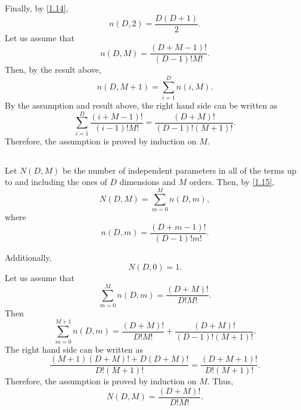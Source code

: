 Finally, by \ref{1.14},
%
\begin{equation}
n(D, 2)
=
\frac{D (D + 1)}{2}.
\end{equation}
%
Let us assume that
%
\begin{equation}
n(D, M)
=
\frac{(D + M - 1)!}{(D - 1)! M!}.
\end{equation}
%
Then, by the result above,
%
\begin{equation}
n(D, M + 1)
=
\sum_{i = 1}^{D}
n(i, M).
\end{equation}
%
By the assumption and result above, the right hand side can be written as
%
\begin{equation}
\sum_{i = 1}^{D}
\frac{(i + M - 1)!}{(i - 1)! M!}
=
\frac{(D + M)!}{(D - 1)! (M + 1)!}.
\end{equation}
%
Therefore, the assumption is proved by induction on $M$.


\subsection{}
\label{1.16}
Let $N(D, M)$ be the number of independent parameters in all of the terms up to and including the ones of $D$ dimensions and $M$ orders.
Then, by \ref{1.15},
%
\begin{equation}
N(D, M)
=
\sum_{m = 0}^{M}
n(D, m),
\end{equation}
%
where
%
\begin{equation}
n(D, m)
=
\frac{(D + m - 1)!}{(D - 1)! m!}.
\end{equation}
%

Additionally,
%
\begin{equation}
N(D, 0)
=
1.
\end{equation}
%
Let us assume that
%
\begin{equation}
\sum_{m = 0}^{M}
n(D, m)
=
\frac{(D + M)!}{D! M!}.
\end{equation}
%
Then
%
\begin{equation}
\sum_{m = 0}^{M + 1}
n(D, m)
=
\frac{(D + M)!}{D! M!}
+
\frac{(D + M)!}{(D - 1)! (M + 1)!}.
\end{equation}
%
The right hand side can be written as
%
\begin{equation}
\frac{(M + 1) (D + M)! + D (D + M)!}{D! (M + 1)!}
=
\frac{(D + M + 1)!}{D! (M + 1)!}.
\end{equation}
%
Therefore, the assumption is proved by induction on $M$.
Thus,
%
\begin{equation}
N(D, M)
=
\frac{(D + M)!}{D! M!}.
\end{equation}
%

